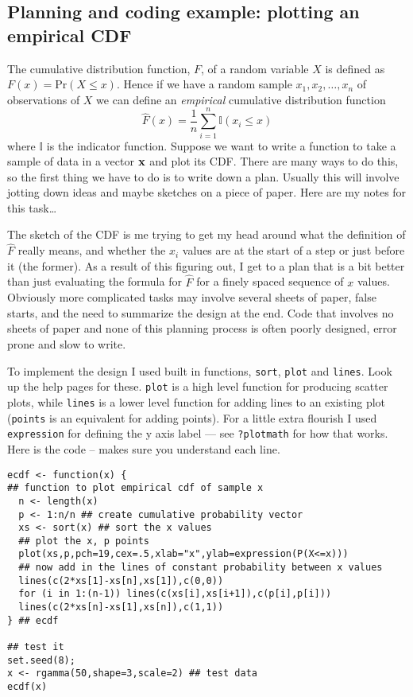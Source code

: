 \documentclass[10pt] {article}
\newcommand{\eps}[3]
{{\begin{center}
 \rotatebox{#1}{\scalebox{#2}{\texttt{[image: \#3]}}}
 \end{center}}
}
\theoremstyle{definition}
\begin{document}
\subsection{Planning and coding example: plotting an empirical CDF}

The cumulative distribution function, $F$, of a random variable $X$ is defined as $F(x) = \text{Pr}(X\le x)$. Hence if we have a random sample $x_1, x_2, \ldots, x_n$ of observations of $X$ we can define an {\em empirical} cumulative distribution function
$$
\hat F(x) = \frac{1}{n}\sum_{i=1}^n \mathbb{I} (x_i \le x)
$$
where $\mathbb{I}$ is the indicator function. Suppose we want to write a function to take a sample of data in a vector $\bf x$ and plot its CDF. There are many ways to do this, so the first thing we have to do is to write down a plan. Usually this will involve jotting down ideas and maybe sketches on a piece of paper. Here are my notes for this task\ldots{}

\eps{0}{.7}{cdf-plan.pdf}

The sketch of the CDF  is me trying to get my head around what the definition of $\hat F$ really means, and whether the $x_i$ values are at the start of a step or just before it (the former). As a result of this figuring out, I get to a plan that is a bit better than just evaluating the formula for $\hat F$ for a finely spaced sequence of $x$ values. Obviously more complicated tasks may involve several sheets of paper, false starts, and the need to summarize the design at the end. Code that involves no sheets of paper and none of this planning process is often poorly designed, error prone and slow to write. 

To implement the design I used built in functions, {\tt sort}, {\tt plot} and {\tt lines}. Look up the help pages for these. {\tt plot} is a high level function for producing scatter plots, while {\tt lines} is a lower level function for adding lines to an existing plot ({\tt points} is an equivalent for adding points). For a little extra flourish I used {\tt expression} for defining the y axis label --- see {\tt ?plotmath} for how that works. Here is the code -- makes sure you understand each line. 
\begin{lstlisting}
ecdf <- function(x) {
## function to plot empirical cdf of sample x
  n <- length(x)
  p <- 1:n/n ## create cumulative probability vector 
  xs <- sort(x) ## sort the x values
  ## plot the x, p points
  plot(xs,p,pch=19,cex=.5,xlab="x",ylab=expression(P(X<=x)))
  ## now add in the lines of constant probability between x values
  lines(c(2*xs[1]-xs[n],xs[1]),c(0,0))
  for (i in 1:(n-1)) lines(c(xs[i],xs[i+1]),c(p[i],p[i]))
  lines(c(2*xs[n]-xs[1],xs[n]),c(1,1))
} ## ecdf

## test it
set.seed(8);
x <- rgamma(50,shape=3,scale=2) ## test data
ecdf(x)
\end{lstlisting}
\eps{-90}{.4}{ecdf.eps}
\end{document}
